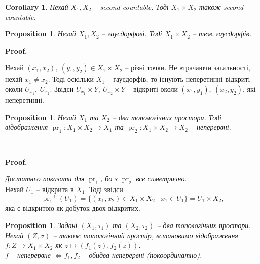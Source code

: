 \documentclass[a4paper, 10pt]{article}
\makeatletter
\theoremstyle{theoremdd}
\newtheorem{proposition}[theorem]{Proposition}
\newtheorem{corollary}[theorem]{Corollary}
\DeclareMathOperator{\pr}{pr}
\renewenvironment{proof}[1][Proof.\\]{\par
\pushQED{\hfill \qed}%
\normalfont \topsep6\p@\@plus6\p@\relax
\trivlist
\item\relax
{\bfseries
#1\@addpunct{.}}\hspace\labelsep\ignorespaces
}{%
\popQED\endtrivlist\@endpefalse
}
\makeatother
\begin{document}
\begin{corollary}
Нехай $X_1,X_2$ -- second-countable. Тоді $X_1 \times X_2$ також second-countable. 
\end{corollary}

\begin{proposition}
Нехай $X_1,X_2$ -- гаусдорфові. Тоді $X_1 \times X_2$ -- теж гаусдорфів.
\end{proposition}

\begin{proof}
Нехай $(x_1,x_2),\ (y_1,y_2) \in X_1 \times X_2$ --  різні точки. Не втрачаючи загальності, нехай $x_1 \neq x_2$. Тоді оскільки $X_1$ -- гаусдорфів, то існують неперетинні відкриті околи $U_{x_1},\ U_{x_2}$. Звідси $U_{x_1} \times Y,\ U_{x_2} \times Y$ -- відкриті околи $(x_1,y_1),\ (x_2,y_2)$, які неперетинні.
\end{proof}

\begin{proposition}
Нехай $X_1$ та $X_2$ -- два топологічних простори. Тоді відображення $\pr_1 \colon X_1 \times X_2 \to X_1$ та $\pr_2 \colon X_1 \times X_2 \to X_2$ -- неперервні.
\begin{figure}[H]
\centering
{}\\
\end{figure}
\end{proposition}

\begin{proof}
\textit{Достатньо показати для $\pr_1$, бо з $\pr_2$ все симетрично}.\\
Нехай $U_1$ -- відкрита в $X_1$. Тоді звідси \[
\pr_1^{-1}(U_1) = \{ (x_1,x_2) \in X_1 \times X_2 \mid x_1 \in U_1 \} = U_1 \times X_2,
\] яка є відкритою як добуток двох відкритих.
\end{proof}

\begin{proposition}
Задані $(X_1,\tau_1)$ та $(X_2,\tau_2)$ -- два топологічних простори. Нехай $(Z,\sigma)$ -- також топологічний простір, встановимо відображення $f \colon Z \to X_1 \times X_2$ як $z \mapsto (f_1(z),f_2(z))$.\\
$f$ -- неперервне $\iff f_1,f_2$ -- обидва неперервні (покоординатно).
\end{proposition}
\end{document}
